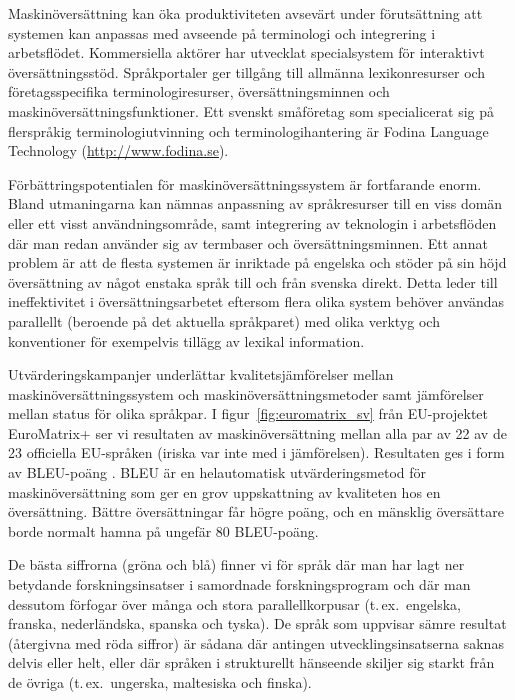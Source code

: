 \begin{multicols}{2}

Maskin\-över\-sätt\-ning kan öka produktiviteten avsevärt under
förutsättning att systemen kan an\-pas\-sas med avseende på
terminologi och integrering i arbetsflödet. Kommersiella aktörer har
utvecklat specialsystem för interaktivt
översättningsstöd. Språkportaler ger tillgång till allmänna
lexikonresurser och företagsspecifika terminologiresurser,
översättningsminnen och maskin\-över\-sätt\-ningsfunktioner. Ett svenskt
småföretag som specialicerat sig på flerspråkig terminologiutvinning
och terminologihantering är Fodina Language
Technology (\url{http://www.fodina.se}).

Förbättringspotentialen för maskin\-över\-sätt\-nings\-sys\-tem är fortfarande
enorm. Bland utmaningarna kan nämnas anpassning av språkresurser till
en viss domän eller ett visst användningsområde, samt integrering av
teknologin i arbetsflöden där man redan använder sig av termbaser och
översättningsminnen. Ett annat problem är att de flesta systemen är
inriktade på engelska och stöder på sin höjd översättning av något
enstaka språk till och från svenska direkt. Detta leder till
ineffektivitet i översättningsarbetet eftersom flera olika system
behöver användas parallellt (beroende på det aktuella språkparet) med
olika verktyg och konventioner för exempelvis tillägg av lexikal
information.

Utvärderingskampanjer underlättar kvalitetsjämförelser mellan
maskin\-över\-sätt\-ningssystem och maskin\-över\-sätt\-ningsmetoder samt
jämförelser mellan status för olika språkpar. I
figur~\ref{fig:euromatrix_sv} från EU-projektet EuroMatrix+ ser vi
resultaten av maskin\-över\-sätt\-ning mellan alla par av 22 av de 23
officiella EU-språken (iriska var inte med i jämförelsen). Resultaten
ges i form av BLEU-poäng \cite{bleu1}. BLEU är en helautomatisk
utvärderingsmetod för maskin\-över\-sätt\-ning som ger en grov uppskattning
av kvaliteten hos en översättning. Bättre översättningar får högre
poäng, och en mänsklig översättare borde normalt hamna på ungefär 80
BLEU-poäng.

De bästa siffrorna (gröna och blå) finner vi för språk där man har
lagt ner betydande forskningsinsatser i samordnade forskningsprogram
och där man dessutom förfogar över många och stora parallellkorpusar
(t.\,ex.~engelska, franska, nederländska, spanska och tyska). De språk
som uppvisar sämre resultat (återgivna med röda siffror) är sådana där
antingen utvecklingsinsatserna saknas delvis eller helt, eller där
språken i strukturellt hänseende skiljer sig starkt från de övriga
(t.\,ex.~ungerska, maltesiska och finska).



\end{multicols}
